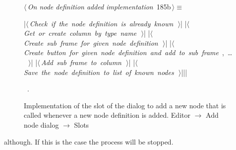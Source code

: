 \documentclass[%
    a4paper,    %
    justified,  %
    nobib,      %
    openany     %
]{tufte-book}
\makeatletter
\renewcommand{\label}[1]{\@tufte@label{##1}}%
\makeatother
\begin{document}
\begin{figure}[!htbp]
\begin{flushleft} \small
\begin{minipage}{\linewidth}\label{scrap160}\raggedright\small
{} $\langle\,${\itshape On node definition added implementation}\nobreak\ {\footnotesize {185b}}$\,\rangle\equiv$
\vspace{-1ex}
\begin{pythoncode}
|\hbox{$\langle\,${\itshape Check if the node definition is already known}\nobreak\ {\footnotesize {}}$\,\rangle$}|
|\hbox{$\langle\,${\itshape Get or create column by type name}\nobreak\ {\footnotesize {}}$\,\rangle$}|
|\hbox{$\langle\,${\itshape Create sub frame for given node definition}\nobreak\ {\footnotesize {}}$\,\rangle$}|
|\hbox{$\langle\,${\itshape Create button for given node definition and add to sub frame}\nobreak\ {\footnotesize {}, \ldots\ }$\,\rangle$}|
|\hbox{$\langle\,${\itshape Add sub frame to column}\nobreak\ {\footnotesize {}}$\,\rangle$}|
|\hbox{$\langle\,${\itshape Save the node definition to list of known nodes}\nobreak\ {\footnotesize {}}$\,\rangle$}||\NWsep|
\end{pythoncode}
\vspace{1.5ex}
\footnotesize
\begin{list}{}{\setlength{\itemsep}{-\parsep}\setlength{\itemindent}{-\leftmargin}}
\item \NWtxtMacroRefIn\ .

\item{}
\end{list}
\end{minipage}\vspace{4ex}
\end{flushleft}
\vspace*{-20mm}\caption{Implementation of the slot of the dialog to add a new node that is
  called whenever a new node definition is added.
  \newline{}\newline{}Editor $\rightarrow$ Add node dialog $\rightarrow$ Slots}
\end{figure}

 although. If this is the
case the process will be stopped.
\end{document}
